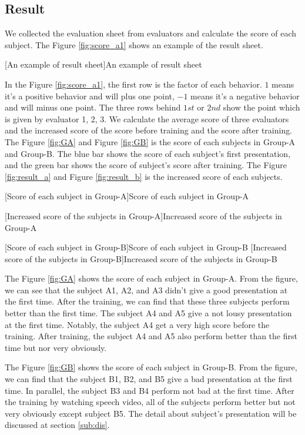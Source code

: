 \subsection*{Result}
\par We collected the evaluation sheet from evaluators and calculate the score of each subject. The Figure \ref{fig:score_a1} shows an example of the result sheet. 

[An example of result sheet]{An example of result sheet}

 \par In the Figure \ref{fig:score_a1}, the first row is the factor of each behavior. $1$ means it's a positive behavior and will plus one point, $-1$ means it's a negative behavior and will minus one point. The three rows behind $1st$ or $2nd$ show the point which is given by evaluator 1, 2, 3. We calculate the average score of three evaluators and the increased score of the score before training and the score after training. The Figure \ref{fig:GA} and Figure \ref{fig:GB} is the score of each subjects in Group-A and Group-B. The blue bar shows the score of each subject's first presentation, and the green bar shows the score of subject's score after training. The Figure \ref{fig:result_a} and Figure \ref{fig:result_b} is the increased score of each subjects. 

[Score of each subject in Group-A]{Score of each subject in Group-A}

[Increased score of the subjects in Group-A]{Increased score of the subjects in Group-A}

\newpage
{}[Score of each subject in Group-B]{Score of each subject in Group-B}
[Increased score of the subjects in Group-B]{Increased score of the subjects in Group-B}
\par The Figure \ref{fig:GA} shows the score of each subject in Group-A. From the figure, we can see that the subject A1, A2, and A3 didn't give a good presentation at the first time. After the training, we can find that these three subjects perform better than the first time. The subject A4 and A5 give a not lousy presentation at the first time. Notably, the subject A4 get a very high score before the training. After training, the subject A4 and A5 also perform better than the first time but nor very obviously.

\par The Figure \ref{fig:GB} shows the score of each subject in Group-B. From the figure, we can find that the subject B1, B2, and B5 give a bad presentation at the first time. In parallel, the subject B3 and B4 perform not bad at the first time. After the training by watching speech video, all of the subjects perform better but not very obviously except subject B5. The detail about subject's presentation will be discussed at section \ref{sub:dis}.


